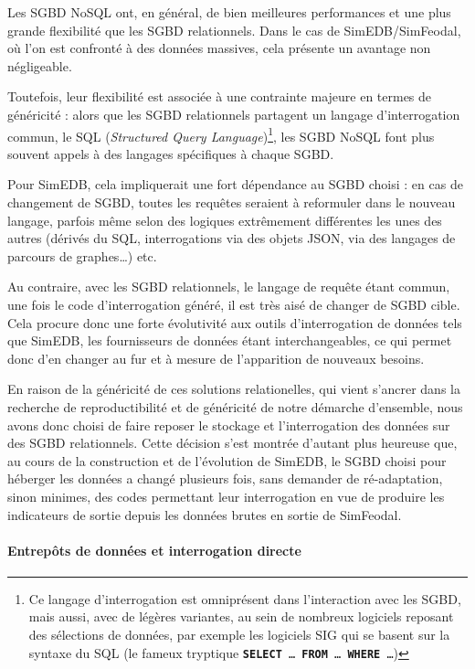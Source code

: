 			Les SGBD NoSQL ont, en général, de bien meilleures performances et une plus grande flexibilité que les SGBD relationnels.
			Dans le cas de SimEDB/SimFeodal, où l'on est confronté à des données massives, cela présente un avantage non négligeable.
			
			Toutefois, leur flexibilité est associée à une contrainte majeure en termes de généricité : alors que les SGBD relationnels partagent un langage d'interrogation commun, le SQL (\textit{Structured Query Language})\footnote{
			Ce langage d'interrogation est omniprésent dans l'interaction avec les SGBD, mais aussi, avec de légères variantes, au sein de nombreux logiciels reposant des sélections de données, par exemple les logiciels SIG qui se basent sur la syntaxe du SQL (le fameux tryptique \texttt{\textbf{SELECT} \ldots~\textbf{FROM} \ldots{} \textbf{WHERE} \ldots})
			}, les SGBD NoSQL font plus souvent appels à des langages spécifiques à chaque SGBD.
		
			Pour SimEDB, cela impliquerait une fort dépendance au SGBD choisi : en cas de changement de SGBD, toutes les requêtes seraient à reformuler dans le nouveau langage, parfois même selon des logiques extrêmement différentes les unes des autres (dérivés du SQL, interrogations via des objets JSON, via des langages de parcours de graphes\ldots{}) etc.
			
			Au contraire, avec les SGBD relationnels, le langage de requête étant commun, une fois le code d'interrogation généré, il est très aisé de changer de SGBD cible.
			Cela procure donc une forte évolutivité aux outils d'interrogation de données tels que SimEDB, les fournisseurs de données étant interchangeables, ce qui permet donc d'en changer au fur et à mesure de l'apparition de nouveaux besoins.
			
			En raison de la généricité de ces solutions relationelles, qui vient s'ancrer dans la recherche de reproductibilité et de généricité de notre démarche d'ensemble, nous avons donc choisi de faire reposer le stockage et l'interrogation des données sur des SGBD relationnels. Cette décision s'est montrée d'autant plus heureuse que, au cours de la construction et de l'évolution de SimEDB, le SGBD choisi pour héberger les données a changé plusieurs fois, sans demander de ré-adaptation, sinon minimes, des codes permettant leur interrogation en vue de produire les indicateurs de sortie depuis les données brutes en sortie de SimFeodal.
			

			\paragraph*{Entrepôts de données et interrogation directe}\label{par:interrogation-directe}
			

